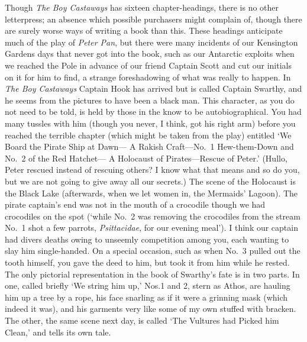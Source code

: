 Though \emph{The Boy Castaways} has sixteen chapter-headings,
there is no other letterpress;
an absence which possible purchasers might complain of,
though there are surely worse ways of writing a book than this.
These headings anticipate much of the play of \emph{Peter Pan},
but there were many incidents of our Kensington Gardens days that never got into the book,
such as our Antarctic exploits
when we reached the Pole in advance of our friend Captain Scott
and cut our initials on it for him to find,
a strange foreshadowing of what was really to happen.
In \emph{The Boy Castaways} Captain Hook has arrived but is called Captain Swarthy,
and he seems from the pictures to have been a black man.
This character, as you do not need to be told,
is held by those in the know to be autobiographical.
You had many tussles with him
(though you never, I think, got his right arm)
before you reached the terrible chapter
(which might be taken from the play)
entitled ‘We Board the Pirate Ship at Dawn—%
A Rakish Craft—No.~1 Hew-them-Down and No.~2 of the Red Hatchet—%
A Holocaust of Pirates—Rescue of Peter.’
(Hullo, Peter rescued instead of rescuing others?
I know what that means and so do you, but we are not going to give away all our secrets.)
The scene of the Holocaust is the Black Lake
(afterwards, when we let women in, the Mermaids’ Lagoon).
The pirate captain’s end was not in the mouth of a crocodile though we had crocodiles on the spot
(‘while No.~2 was removing the crocodiles from the stream
No.~1 shot a few parrots, \emph{Psittacidae}, for our evening meal’).
I think our captain had divers deaths owing to unseemly competition among you,
each wanting to slay him single-handed.
On a special occasion, such as when No.~3 pulled out the tooth himself,
you gave the deed to him, but took it from him while he rested.
The only pictorial representation in the book of Swarthy’s fate is in two parts.
In one, called briefly ‘We string him up,’
Nos.\@ 1 and 2, stern as Athos, are hauling him up a tree by a rope,
his face snarling as if it were a grinning mask (which indeed it was),
and his garments very like some of my own stuffed with bracken.
The other, the same scene next day, is called ‘The Vultures had Picked him Clean,’
and tells its own tale.

